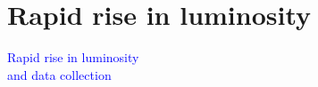 \documentclass[compress]{beamer}
\begin{document}

\section*{Rapid rise in luminosity}
\begin{frame}
\begin{center}
\Huge \textcolor{blue}{Rapid rise in luminosity \\ and data collection}
\end{center}
\end{frame}
\end{document}
